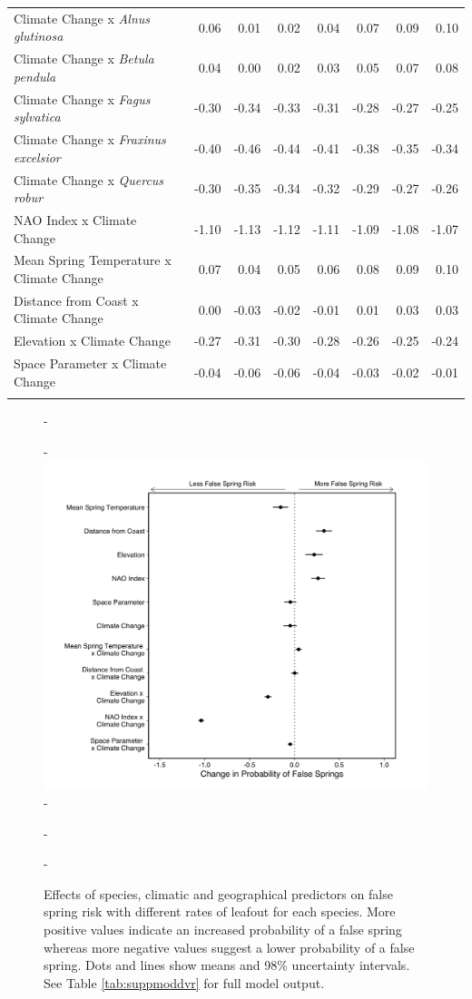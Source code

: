 \documentclass{article}\usepackage[]{graphicx}\usepackage[]{color}
\begin{document}
\begin{longtable}{lrrrrrrr}
  Climate Change
x\textit{ Alnus glutinosa} & 0.06 & 0.01 & 0.02 & 0.04 & 0.07 & 0.09 & 0.10 \\ 
  Climate Change
x\textit{ Betula pendula} & 0.04 & 0.00 & 0.02 & 0.03 & 0.05 & 0.07 & 0.08 \\ 
  Climate Change
x\textit{ Fagus sylvatica} & -0.30 & -0.34 & -0.33 & -0.31 & -0.28 & -0.27 & -0.25 \\ 
  Climate Change
x\textit{ Fraxinus excelsior} & -0.40 & -0.46 & -0.44 & -0.41 & -0.38 & -0.35 & -0.34 \\ 
  Climate Change
x\textit{ Quercus robur} & -0.30 & -0.35 & -0.34 & -0.32 & -0.29 & -0.27 & -0.26 \\ 
  NAO Index x Climate Change & -1.10 & -1.13 & -1.12 & -1.11 & -1.09 & -1.08 & -1.07 \\ 
  Mean Spring 
Temperature x Climate Change & 0.07 & 0.04 & 0.05 & 0.06 & 0.08 & 0.09 & 0.10 \\ 
  Distance from 
Coast x Climate Change & 0.00 & -0.03 & -0.02 & -0.01 & 0.01 & 0.03 & 0.03 \\ 
  Elevation x Climate Change & -0.27 & -0.31 & -0.30 & -0.28 & -0.26 & -0.25 & -0.24 \\ 
  Space Parameter x Climate Change & -0.04 & -0.06 & -0.06 & -0.04 & -0.03 & -0.02 & -0.01 \\ 
   \hline
\hline
\label{tab:suppmodlong}
\end{longtable}


  
{\begin{figure} [H]
  -\begin{center}
  -\includegraphics[width=12cm]{..//..//analyses/figures/model_output_98_dvrlong.png}
  -\caption{Effects of species, climatic and geographical predictors on false spring risk with different rates of leafout for each species. More positive values indicate an increased probability of a false spring whereas more negative values suggest a lower probability of a false spring. Dots and lines show means and 98\% uncertainty intervals. See Table \ref{tab:suppmoddvr} for full model output. }\label{fig:dvr}
  -\end{center}
  -\end{figure}}
  
\end{document}
